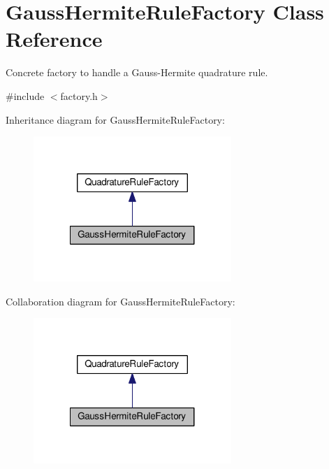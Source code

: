 \hypertarget{classGaussHermiteRuleFactory}{\section{Gauss\-Hermite\-Rule\-Factory Class Reference}
\label{classGaussHermiteRuleFactory}
}


Concrete factory to handle a Gauss-\/\-Hermite quadrature rule.  




{\ttfamily \#include $<$factory.\-h$>$}



Inheritance diagram for Gauss\-Hermite\-Rule\-Factory\-:\nopagebreak
\begin{figure}[H]
\begin{center}
\leavevmode
\includegraphics[width=212pt]{classGaussHermiteRuleFactory__inherit__graph}
\end{center}
\end{figure}


Collaboration diagram for Gauss\-Hermite\-Rule\-Factory\-:\nopagebreak
\begin{figure}[H]
\begin{center}
\leavevmode
\includegraphics[width=212pt]{classGaussHermiteRuleFactory__coll__graph}
\end{center}
\end{figure}
